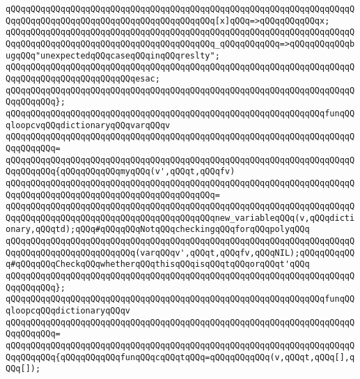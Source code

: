 \verb|qQQqqQQqqQQqqQQqqQQqqQQqqQQqqQQqqQQqqQQqqQQqqQQqqQQqqQQqqQQqqQQqqQQqqQQqqQQqqQQqqQQqqQQqqQQqqQQqqQQqqQQqqQQqqQQq[x]qQQq=>qQQqqQQqqQQqx;|\newline
\verb|qQQqqQQqqQQqqQQqqQQqqQQqqQQqqQQqqQQqqQQqqQQqqQQqqQQqqQQqqQQqqQQqqQQqqQQqqQQqqQQqqQQqqQQqqQQqqQQqqQQqqQQqqQQqqQQq_qQQqqQQqqQQq=>qQQqqQQqqQQqbugqQQq"unexpectedqQQqcaseqQQqinqQQqreslty";|\newline
\verb|qQQqqQQqqQQqqQQqqQQqqQQqqQQqqQQqqQQqqQQqqQQqqQQqqQQqqQQqqQQqqQQqqQQqqQQqqQQqqQQqqQQqqQQqqQQqqQQqesac;|\newline
\verb|qQQqqQQqqQQqqQQqqQQqqQQqqQQqqQQqqQQqqQQqqQQqqQQqqQQqqQQqqQQqqQQqqQQqqQQqqQQqqQQq};|\newline
\newline
\verb|qQQqqQQqqQQqqQQqqQQqqQQqqQQqqQQqqQQqqQQqqQQqqQQqqQQqqQQqqQQqqQQqfunqQQqloopcvqQQqdictionaryqQQqvarqQQqv|\newline
\verb|qQQqqQQqqQQqqQQqqQQqqQQqqQQqqQQqqQQqqQQqqQQqqQQqqQQqqQQqqQQqqQQqqQQqqQQqqQQqqQQq=|\newline
\verb|qQQqqQQqqQQqqQQqqQQqqQQqqQQqqQQqqQQqqQQqqQQqqQQqqQQqqQQqqQQqqQQqqQQqqQQqqQQqqQQq{qQQqqQQqqQQqmyqQQq(v',qQQqt,qQQqfv)|\newline
\verb|qQQqqQQqqQQqqQQqqQQqqQQqqQQqqQQqqQQqqQQqqQQqqQQqqQQqqQQqqQQqqQQqqQQqqQQqqQQqqQQqqQQqqQQqqQQqqQQqqQQqqQQqqQQqqQQq=|\newline
\verb|qQQqqQQqqQQqqQQqqQQqqQQqqQQqqQQqqQQqqQQqqQQqqQQqqQQqqQQqqQQqqQQqqQQqqQQqqQQqqQQqqQQqqQQqqQQqqQQqqQQqqQQqqQQqqQQqnew_variableqQQq(v,qQQqdictionary,qQQqtd);qQQq#qQQqqQQqNotqQQqcheckingqQQqforqQQqpolyqQQq|\newline
\newline
\verb|qQQqqQQqqQQqqQQqqQQqqQQqqQQqqQQqqQQqqQQqqQQqqQQqqQQqqQQqqQQqqQQqqQQqqQQqqQQqqQQqqQQqqQQqqQQqqQQq(varqQQqv',qQQqt,qQQqfv,qQQqNIL);qQQqqQQqqQQq#qQQqqQQqCheckqQQqwhetherqQQqthisqQQqisqQQqtqQQqorqQQqt'qQQq|\newline
\verb|qQQqqQQqqQQqqQQqqQQqqQQqqQQqqQQqqQQqqQQqqQQqqQQqqQQqqQQqqQQqqQQqqQQqqQQqqQQqqQQq};|\newline
\newline
\verb|qQQqqQQqqQQqqQQqqQQqqQQqqQQqqQQqqQQqqQQqqQQqqQQqqQQqqQQqqQQqqQQqfunqQQqloopcqQQqdictionaryqQQqv|\newline
\verb|qQQqqQQqqQQqqQQqqQQqqQQqqQQqqQQqqQQqqQQqqQQqqQQqqQQqqQQqqQQqqQQqqQQqqQQqqQQqqQQq=|\newline
\verb|qQQqqQQqqQQqqQQqqQQqqQQqqQQqqQQqqQQqqQQqqQQqqQQqqQQqqQQqqQQqqQQqqQQqqQQqqQQqqQQq{qQQqqQQqqQQqfunqQQqcqQQqtqQQq=qQQqqQQqqQQq(v,qQQqt,qQQq[],qQQq[]);|\newline
